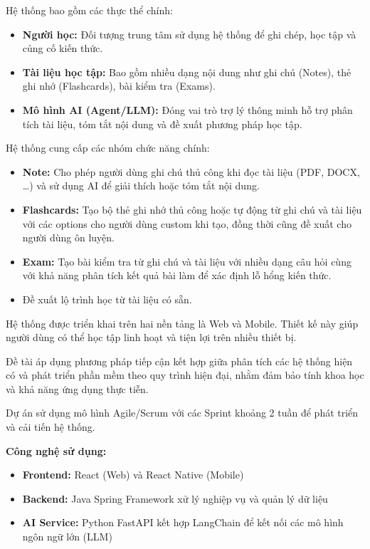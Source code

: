 Hệ thống bao gồm các thực thể chính:
\begin{itemize}
    \item \textbf{Người học:} Đối tượng trung tâm sử dụng hệ thống để ghi chép, học tập và củng cố kiến thức.
    \item \textbf{Tài liệu học tập:} Bao gồm nhiều dạng nội dung như ghi chú (Notes), thẻ ghi nhớ (Flashcards), bài kiểm tra (Exams).
    \item \textbf{Mô hình AI (Agent/LLM):} Đóng vai trò trợ lý thông minh hỗ trợ phân tích tài liệu, tóm tắt nội dung và đề xuất phương pháp học tập.
\end{itemize}

Hệ thống cung cấp các nhóm chức năng chính:
\begin{itemize}
    \item \textbf{Note:} Cho phép người dùng ghi chú thủ công khi đọc tài liệu (PDF, DOCX, \ldots) và sử dụng AI để giải thích hoặc tóm tắt nội dung.
    \item \textbf{Flashcards:} Tạo bộ thẻ ghi nhớ thủ công hoặc tự động từ ghi chú và tài liệu với các options cho người dùng custom khi tạo, đồng thời cũng đề xuất cho người dùng ôn luyện.
    \item \textbf{Exam:} Tạo bài kiểm tra từ ghi chú và tài liệu với nhiều dạng câu hỏi cùng với khả năng phân tích kết quả bài làm để xác định lỗ hổng kiến thức.
    \item Đề xuất lộ trình học từ tài liệu có sẵn.
\end{itemize}

Hệ thống được triển khai trên hai nền tảng là Web và Mobile. Thiết kế này giúp người dùng có thể học tập linh hoạt và tiện lợi trên nhiều thiết bị.

Đề tài áp dụng phương pháp tiếp cận kết hợp giữa phân tích các hệ thống hiện có và phát triển phần mềm theo quy trình hiện đại, nhằm đảm bảo tính khoa học và khả năng ứng dụng thực tiễn.

Dự án sử dụng mô hình Agile/Scrum với các Sprint khoảng 2 tuần để phát triển và cải tiến hệ thống.

\textbf{Công nghệ sử dụng:}
\begin{itemize}
    \item \textbf{Frontend:} React (Web) và React Native (Mobile)
    \item \textbf{Backend:} Java Spring Framework xử lý nghiệp vụ và quản lý dữ liệu
    \item \textbf{AI Service:} Python FastAPI kết hợp LangChain để kết nối các mô hình ngôn ngữ lớn (LLM)
\end{itemize}

